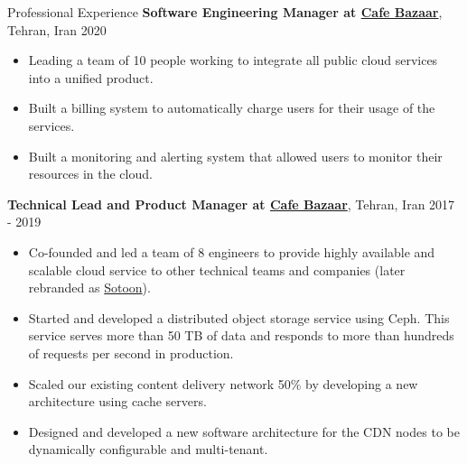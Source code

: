 \documentclass{resume} %
\begin{document}
\begin{rSection}{Professional Experience}
	{\bf Software Engineering Manager at \href{https://cafebazaar.ir/app?l=en}{Cafe Bazaar}}, Tehran, Iran \hfill 2020
	\smallskip
	\vspace{-0.5em}
	\begin{itemize}[leftmargin=3mm]
		\setlength{\itemsep}{1pt}
		\setlength{\parskip}{0pt}
		\setlength{\parsep}{0pt}
		\renewcommand\labelitemi{$\cdot$}

		\item Leading a team of 10 people working to integrate all public cloud services 
        	into a unified product.
		\item Built a billing system to automatically charge users for
            their usage of the services.
		\item Built a monitoring and alerting system that allowed users
            to monitor their resources in the cloud.
	\end{itemize}
	
	{\bf Technical Lead and Product Manager at \href{https://cafebazaar.ir/app?l=en}{Cafe Bazaar}}, Tehran, Iran \hfill 2017 - 2019
	\smallskip
	\vspace{-0.5em}
	\begin{itemize}[leftmargin=3mm]
		\setlength{\itemsep}{1pt}
		\setlength{\parskip}{0pt}
		\setlength{\parsep}{0pt}
		\renewcommand\labelitemi{$\cdot$}

		\item Co-founded and led a team of 8 engineers to provide highly available and 
      scalable cloud service to other technical teams and companies (later rebranded 
      as \href{https://sotoon.ir/}{Sotoon}).
		\item Started and developed a distributed object storage service using Ceph. 
      This service serves more than 50 TB of data and responds to more than hundreds of 
      requests per second in production.
		\item Scaled our existing content delivery network 50\% by developing a new 
      architecture using cache servers.
		\item Designed and developed a new software architecture for the CDN nodes to be 
      dynamically configurable and multi-tenant.%
	\end{itemize}
	

\end{rSection}
\end{document}
